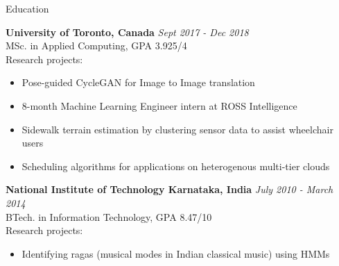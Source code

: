 \documentclass{resume} %
\begin{document}

\begin{rSection}{Education}

{\bf University of Toronto, Canada} \hfill {\em Sept 2017 - Dec 2018} \\ 
MSc. in Applied Computing, GPA 3.925/4 \\
Research projects:
\vspace{-2mm}
  \begin{itemize}
    \item Pose-guided CycleGAN for Image to Image translation
    \item 8-month Machine Learning Engineer intern at ROSS Intelligence
    \item Sidewalk terrain estimation by clustering sensor data to assist wheelchair users
    \item Scheduling algorithms for applications on heterogenous multi-tier clouds
  \end{itemize}


{\bf National Institute of Technology Karnataka, India} \hfill {\em July 2010 - March 2014} \\ 
BTech. in Information Technology, GPA 8.47/10 \\
Research projects:
\vspace{-2mm}
  \begin{itemize}
    \item  Identifying ragas (musical modes in Indian classical music) using HMMs
  \end{itemize}


\end{rSection}

\end{document}
